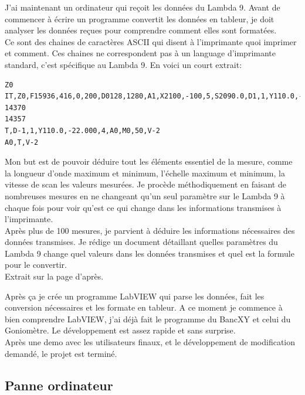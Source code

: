 \documentclass[12pt]{article}
\begin{document}
\FloatBarrier
J'ai maintenant un ordinateur qui reçoit les données du Lambda 9.
Avant de commencer à écrire un programme convertit les données en tableur, je doit analyser les données reçues pour comprendre comment elles sont formatées.\\
Ce sont des chaines de caractères ASCII qui disent à l'imprimante quoi imprimer et comment.
Ces chaines ne correspondent pas à un language d'imprimante standard, c'est spécifique au Lambda 9.
En voici un court extrait:
\begin{lstlisting}
Z0
IT,Z0,F15936,416,0,200,D0128,1280,A1,X2100,-100,5,S2090.0,D1,1,Y110.0,-22.000,4,Z0,D0128,1280,L1
14370
14357
T,D-1,1,Y110.0,-22.000,4,A0,M0,50,V-2
A0,T,V-2
\end{lstlisting}
Mon but est de pouvoir déduire tout les éléments essentiel de la mesure, comme la longueur d'onde maximum et minimum, l'échelle maximum et minimum, la vitesse de scan les valeurs mesurées.
Je procède méthodiquement en faisant de nombreuses mesures en ne changeant qu'un seul paramètre sur le Lambda 9 à chaque fois pour voir qu'est ce qui change dans les informations transmises à l'imprimante.\\
Après plus de 100 mesures, je parvient à déduire les informations nécessaires des données transmises.
Je rédige un document détaillant quelles paramètres du Lambda 9 change quel valeurs dans les données transmises et quel est la formule pour le convertir.\\
Extrait sur la page d'après.

  

Après ça je crée un programme LabVIEW qui parse les données, fait les conversion nécessaires et les formate en tableur.
A ce moment je commence à bien comprendre LabVIEW, j'ai déjà fait le programme du BancXY et celui du Goniomètre.
Le développement est assez rapide et sans surprise.\\
Après une demo avec les utilisateurs finaux, et le développement de modification demandé, le projet est terminé.

\newpage
\subsection{ Panne ordinateur }
\end{document}
